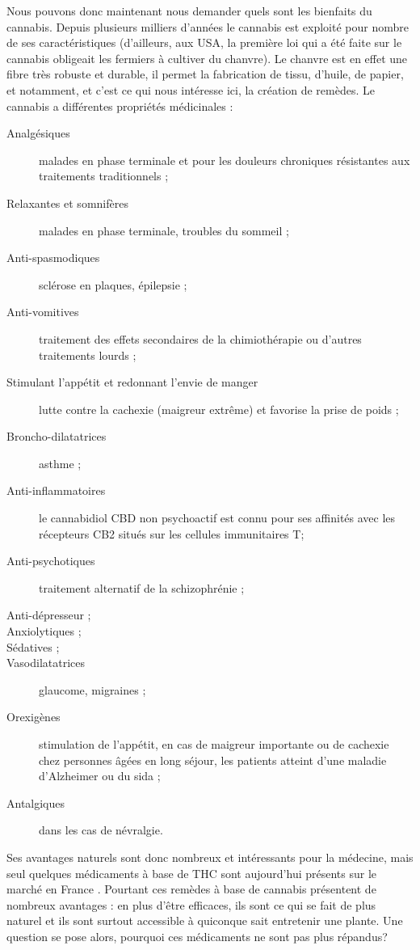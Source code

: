 Nous pouvons donc maintenant nous demander quels sont les bienfaits du cannabis. Depuis plusieurs milliers d’années le cannabis est exploité pour nombre de ses caractéristiques (d’ailleurs, aux USA, la première loi qui a été faite sur le cannabis obligeait les fermiers à cultiver du chanvre).  Le chanvre est en effet une fibre très robuste et durable, il permet la fabrication de tissu, d’huile, de papier, et notamment, et c’est ce qui nous intéresse ici, la création de remèdes. Le cannabis a différentes propriétés médicinales : 
\begin{description}
	\item[Analgésiques] malades en phase terminale et pour les douleurs chroniques résistantes aux traitements traditionnels ; 
    \item[Relaxantes et somnifères] malades en phase terminale, troubles du sommeil ; 
    \item[Anti-spasmodiques] sclérose en plaques, épilepsie ; 
    \item[Anti-vomitives] traitement des effets secondaires de la chimiothérapie ou d'autres traitements lourds ;
    \item[Stimulant l'appétit et redonnant l'envie de manger] lutte contre la cachexie (maigreur extrême) et favorise la prise de poids ; 
    \item[Broncho-dilatatrices] asthme ; 
    \item[Anti-inflammatoires] le cannabidiol CBD non psychoactif est connu pour ses affinités avec les récepteurs CB2 situés sur les cellules immunitaires T;
    \item[Anti-psychotiques] traitement alternatif de la schizophrénie ; 	\item[Anti-dépresseur ;] 
    \item[Anxiolytiques ;]
    \item[Sédatives ;] 
    \item[Vasodilatatrices] glaucome, migraines ; 
    \item[Orexigènes] stimulation de l'appétit, en cas de maigreur importante ou de cachexie chez personnes âgées en long séjour, les patients atteint d'une maladie d'Alzheimer ou du sida ; 
    \item[Antalgiques] dans les cas de névralgie. 
\end{description}

Ses avantages naturels sont donc nombreux et intéressants pour la médecine, mais seul quelques médicaments à base de THC sont aujourd’hui présents sur le marché en France \cite{wikicannabismedical}. Pourtant ces remèdes à base de cannabis présentent de nombreux avantages : en plus d’être efficaces, ils sont ce qui se fait de plus naturel et ils sont surtout accessible à quiconque sait entretenir une plante. Une question se pose alors, pourquoi ces médicaments ne sont pas plus répandus? 


